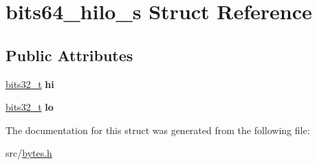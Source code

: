 \hypertarget{structbits64__hilo__s}{}\section{bits64\+\_\+hilo\+\_\+s Struct Reference}
\label{structbits64__hilo__s}
\subsection*{Public Attributes}
\begin{DoxyCompactItemize}
\item 
\hypertarget{structbits64__hilo__s_a0946ebf0589c70719d27a2e48483857b}{}\label{structbits64__hilo__s_a0946ebf0589c70719d27a2e48483857b} 
\hyperlink{unionbits32__t}{bits32\+\_\+t} {\bfseries hi}
\item 
\hypertarget{structbits64__hilo__s_a2aeab9be01dab5f21c7a461d25bd2ab1}{}\label{structbits64__hilo__s_a2aeab9be01dab5f21c7a461d25bd2ab1} 
\hyperlink{unionbits32__t}{bits32\+\_\+t} {\bfseries lo}
\end{DoxyCompactItemize}


The documentation for this struct was generated from the following file\+:\begin{DoxyCompactItemize}
\item 
src/\hyperlink{bytes_8h}{bytes.\+h}\end{DoxyCompactItemize}
